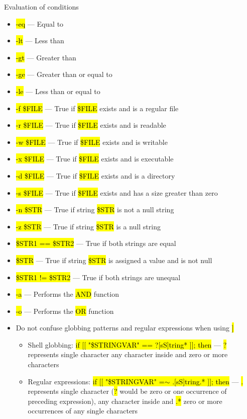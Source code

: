 \documentclass[compress, ucs, xelatex, 11pt, xcolor=svgnames,
  hyperref={
    bookmarks=true,
    unicode=true,
    colorlinks=true,
    pdftitle={Linux, command line and MetaCentrum},
    plainpages=false,
    pdfauthor={Vojtech Zeisek},
    pdfsubject={Course about use of Linux command line, writing shell scripts and using MetaCentrum of CESNET},
    pdfcreator={XeLaTeX},
    pdfkeywords={Linux, GNU, BASH, shell, command line, MetaCentrum},
    linkcolor=DarkRed,
    anchorcolor=DarkBlue,
    citecolor=Indigo,
    filecolor=NavyBlue,
    menucolor=DarkMagenta,
    urlcolor=DarkBlue,
    pdftex},
  url={hyphens, lowtilde} %
  ]{beamer}
\renewcommand{\texttt}[1]{\hl{\ttfamily #1}}
\begin{document}
\begin{frame}[allowframebreaks]{Evaluation of conditions}
\begin{itemize}
\begin{itemize}
\begin{itemize}
      \end{itemize}
    \end{itemize}
    \item \texttt{-eq} --- Equal to
    \item \texttt{-lt} --- Less than
    \item \texttt{-gt} --- Greater than
    \item \texttt{-ge} --- Greater than or equal to
    \item \texttt{-le} --- Less than or equal to
    \item \texttt{-f \$FILE} --- True if \texttt{\$FILE} exists and is a regular file
    \item \texttt{-r \$FILE} --- True if \texttt{\$FILE} exists and is readable
    \item \texttt{-w \$FILE} --- True if \texttt{\$FILE} exists and is writable
    \item \texttt{-x \$FILE} --- True if \texttt{\$FILE} exists and is executable
    \item \texttt{-d \$FILE} --- True if \texttt{\$FILE} exists and is a directory
    \item \texttt{-s \$FILE} --- True if \texttt{\$FILE} exists and has a size greater than zero
    \item \texttt{-n \$STR} --- True if string \texttt{\$STR} is not a null string
    \item \texttt{-z \$STR} --- True if string \texttt{\$STR} is a null string
    \item \texttt{\$STR1 == \$STR2} --- True if both strings are equal
    \item \texttt{\$STR} --- True if string \texttt{\$STR} is assigned a value and is not null
    \item \texttt{\$STR1 != \$STR2} --- True if both strings are unequal
    \item \texttt{-a} --- Performs the \texttt{AND} function
    \item \texttt{-o} --- Performs the \texttt{OR} function
    \item Do not confuse globbing patterns and regular expressions when using \texttt{[[ \ldots~]]}
    \begin{itemize}
      \item Shell globbing: \texttt{if [[ "\$STRINGVAR" == ?[sS]tring* ]]; then} --- \texttt{?} represents single character \texttt{[]} any character inside and \texttt{*} zero or more characters
      \item Regular expressions: \texttt{if [[ "\$STRINGVAR" =$\sim$ .[sS]tring.* ]]; then} --- \texttt{.} represents single character (\texttt{?} would be zero or one occurrence of preceding expression), \texttt{[]} any character inside and \texttt{.*} zero or more occurrences of any single characters
    \end{itemize}
  \end{itemize}
\end{frame}
\end{document}
